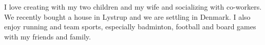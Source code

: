 

I love creating with my two children and my wife and socializing with co-workers. We recently bought a house in Lystrup and we are settling in Denmark. I also enjoy running and team sports, especially badminton, football and board games with my friends and family.  
